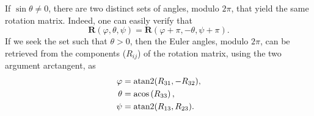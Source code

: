 \documentclass[lineno, pdflatex,sn-mathphys-ay]{sn-jnl}
\theoremstyle{thmstyleone}%
\theoremstyle{thmstyletwo}%
\theoremstyle{thmstylethree}%
\DeclareMathOperator{\atantwo}{atan2}
\renewcommand{\vec}[1]{\boldsymbol{#1}}
\begin{document}
\begin{appendices}
If ${\sin\theta \neq 0}$, there are two distinct sets of angles, modulo $2\pi$,  that yield the same rotation matrix. Indeed, one can easily verify that 
\begin{equation}
\vec{R}(\varphi,\theta,\psi) = \vec{R}(\varphi + \pi,-\theta,\psi + \pi).
\end{equation} 
%
If we seek the set such that ${\theta >0}$, then the Euler angles,  modulo $2\pi$, can be retrieved from the components ($R_{ij}$) of the rotation matrix, using the two argument arctangent, as
\begin{align}
	\varphi &= \atantwo(R_{31}, -R_{32}), \notag\\
	\theta &= \acos \left( R_{33} \right), \\
	\psi &= \atantwo(R_{13}, R_{23}). \notag
\end{align}








\end{appendices}
\end{document}
